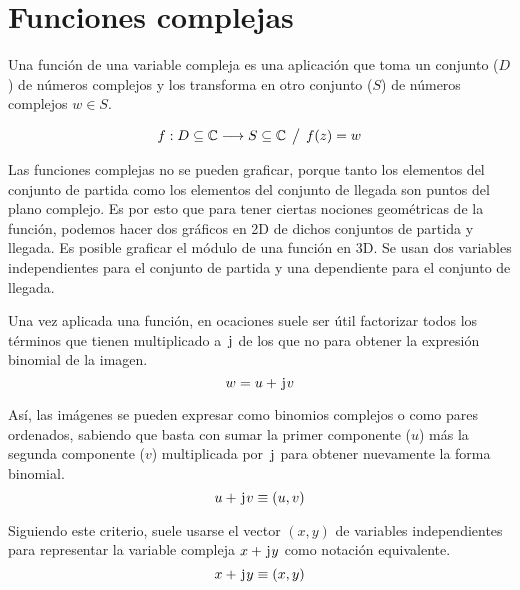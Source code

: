 \chapter{Funciones complejas}

Una función de una variable compleja es una aplicación que toma un conjunto ($D$) de números complejos y los transforma en otro conjunto ($S$) de números complejos $w \in S$.

\begin{mdframed}[style=DefinitionFrame]
    \begin{defn}
        \label{defn:complexFunc1}
    \end{defn}
    \begin{equation*}
        f: D \subseteq \mathbb{C} \longrightarrow S \subseteq \mathbb{C} \hspace{1ex} \big/ \hspace{1ex} f(z) = w
    \end{equation*}
\end{mdframed}

Las funciones complejas no se pueden graficar, porque tanto los elementos del conjunto de partida como los elementos del conjunto de llegada son puntos del plano complejo.
Es por esto que para tener ciertas nociones geométricas de la función, podemos hacer dos gráficos en 2D de dichos conjuntos de partida y llegada.
Es posible graficar el módulo de una función en 3D.
Se usan dos variables independientes para el conjunto de partida y una dependiente para el conjunto de llegada.

Una vez aplicada una función, en ocaciones suele ser útil factorizar todos los términos que tienen multiplicado a $\mkern2mu\mathrm{j}\mkern1mu$ de los que no para obtener la expresión binomial de la imagen.
\begin{equation*}
    w = u + \mkern2mu\mathrm{j}\mkern1mu v
\end{equation*}

Así, las imágenes se pueden expresar como binomios complejos o como pares ordenados, sabiendo que basta con sumar la primer componente ($u$) más la segunda componente ($v$) multiplicada por $\mkern2mu\mathrm{j}\mkern1mu$ para obtener nuevamente la forma binomial.
\begin{equation*}
    u + \mkern2mu\mathrm{j}\mkern1mu v \equiv (u,v)
\end{equation*}

Siguiendo este criterio, suele usarse el vector $(x,y)$ de variables independientes para representar la variable compleja $x + \mkern2mu\mathrm{j}\mkern1mu y$ como notación equivalente.
\begin{equation*}
    x + \mkern2mu\mathrm{j}\mkern1mu y \equiv (x,y)
\end{equation*}

